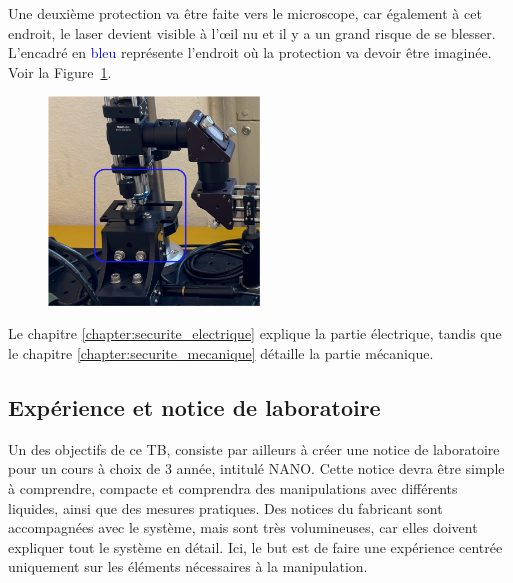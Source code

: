 \begin{minipage}{\textwidth}
    Une deuxième protection va être faite vers le microscope, car également à cet endroit, le laser devient visible à l'\oe{}il nu et il y a un grand risque de se blesser. L'encadré en \textcolor{blue}{bleu} représente l'endroit où la protection va devoir être imaginée. Voir la Figure~\ref{protection_laser_fin}.
    \vspace{1em}
    \begin{figure}[H]
        \begin{center}
            \includegraphics[width=0.5\textwidth]{assets/figures/Introduction/protection_fin_laser.png}
        \end{center}
        \label{protection_laser_fin}
    \end{figure}
\end{minipage}

\vspace{1em}
Le chapitre \ref{chapter:securite_electrique} explique la partie électrique, tandis que le chapitre \ref{chapter:securite_mecanique} détaille la partie mécanique.

\subsection{Expérience et notice de laboratoire}

Un des objectifs de ce TB, consiste par ailleurs à créer une notice de laboratoire pour un cours à choix de 3\ieme{} année, intitulé NANO. Cette notice devra être simple à comprendre, compacte et comprendra des manipulations avec différents liquides, ainsi que des mesures pratiques. Des notices du fabricant sont accompagnées avec le système, mais sont très volumineuses, car elles doivent expliquer tout le système en détail. Ici, le but est de faire une expérience centrée uniquement sur les éléments nécessaires à la manipulation.

